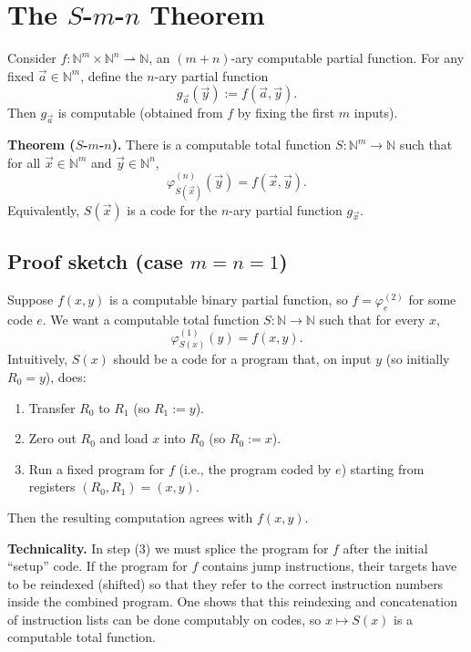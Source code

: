\documentclass[11pt]{article}
\begin{document}
\section{The $S$-$m$-$n$ Theorem}

Consider $f\colon \mathbb{N}^m \times \mathbb{N}^n \rightharpoonup \mathbb{N}$, an $(m+n)$-ary computable partial function. For any fixed $\vec{a} \in \mathbb{N}^m$, define the $n$-ary partial function
\[
    g_{\vec{a}}(\vec{y}) := f(\vec{a}, \vec{y}).
\]
Then $g_{\vec{a}}$ is computable (obtained from $f$ by fixing the first $m$ inputs).

\textbf{Theorem ($S$-$m$-$n$).} There is a computable total function $S\colon \mathbb{N}^m \to \mathbb{N}$ such that for all $\vec{x} \in \mathbb{N}^m$ and $\vec{y} \in \mathbb{N}^n$,
\[
    \varphi_{S(\vec{x})}^{(n)}(\vec{y}) = f(\vec{x}, \vec{y}).
\]
Equivalently, $S(\vec{x})$ is a code for the $n$-ary partial function $g_{\vec{x}}$.

\subsection{Proof sketch (case $m=n=1$)}

Suppose $f(x,y)$ is a computable binary partial function, so $f = \varphi_{e}^{(2)}$ for some code $e$.
We want a computable total function $S\colon \mathbb{N} \to \mathbb{N}$ such that for every $x$,
\[
    \varphi_{S(x)}^{(1)}(y) = f(x,y).
\]
Intuitively, $S(x)$ should be a code for a program that, on input $y$ (so initially $R_0=y$), does:
\begin{enumerate}[leftmargin=1.8em, label=\arabic*)]
    \item Transfer $R_0$ to $R_1$ (so $R_1 := y$).
    \item Zero out $R_0$ and load $x$ into $R_0$ (so $R_0 := x$).
    \item Run a fixed program for $f$ (i.e., the program coded by $e$) starting from registers $(R_0,R_1)=(x,y)$.
\end{enumerate}
Then the resulting computation agrees with $f(x,y)$.

\textbf{Technicality.} In step (3) we must splice the program for $f$ after the initial ``setup'' code. If the program for $f$ contains jump instructions, their targets have to be reindexed (shifted) so that they refer to the correct instruction numbers inside the combined program. One shows that this reindexing and concatenation of instruction lists can be done computably on codes, so $x \mapsto S(x)$ is a computable total function.
\end{document}
